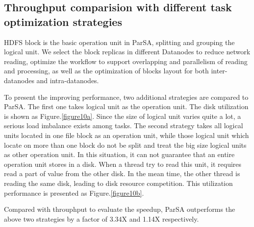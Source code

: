 \documentclass[preprint,12pt]{elsarticle}
\begin{document}
\subsection{Throughput comparision with different task optimization strategies}
HDFS block is the basic operation unit in ParSA, splitting and grouping the logical unit. We select the block replicas in different 
Datanodes to reduce network reading, optimize the workflow to support overlapping and parallelism of reading and processing, as well as 
the optimization of blocks layout for both inter-datanodes and intra-datanodes. \par
To present the improving performance, two additional strategies are compared to ParSA. The first one takes logical unit as the operation
unit. The disk utilization is shown as Figure.\ref{figure10a}. Since the size of logical unit varies quite a lot, a serious load imbalance
exists among tasks. The second strategy takes all logical units located in one file block as an operation unit, while those logical unit 
which locate on more than one block do not be split and treat the big size logical units as other operation unit. In this situation, it can
not guarantee that an entire operation unit stores in a disk. When a thread try to read this unit, it requires read a part of value from the
other disk. In the mean time, the other thread is reading the same disk, leading to disk resource competition. This utilization performance
is presented as Figure.\ref{figure10b}. \par
Compared with throuphput to evaluate the speedup, ParSA outperforms the above two strategies by a factor of 3.34X and 1.14X respectively.
\end{document}

